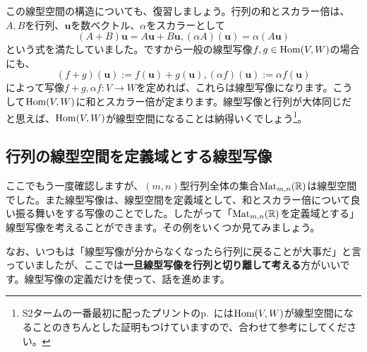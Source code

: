 この線型空間の構造についても、復習しましょう。行列の和とスカラー倍は、$A, B$を行列、$\bm{u}$を数ベクトル、$\alpha$をスカラーとして
\[
(A + B) \bm{u} = A\bm{u} + B\bm{u}, (\alpha A)(\bm{u}) = \alpha (A\bm{u})
\]
という式を満たしていました。ですから一般の線型写像$f, g \in \operatorname{Hom}(V, W)$の場合にも、
\[
(f + g)(\bm{u}) := f(\bm{u}) + g(\bm{u}), (\alpha f)(\bm{u}) := \alpha f(\bm{u})
\]
によって写像$f + g, \alpha f \colon V \rightarrow W$を定めれば、これらは線型写像になります。こうして$\operatorname{Hom}(V, W)$に和とスカラー倍が定まります。線型写像と行列が大体同じだと思えば、$\operatorname{Hom}(V, W)$が線型空間になることは納得いくでしょう\footnote{S2タームの一番最初に配ったプリントのp.~\pageref{subsection:vector_space_of_linear_map}には$\operatorname{Hom}(V, W)$が線型空間になることのきちんとした証明もつけていますので、合わせて参考にしてください。}。

\subsection{行列の線型空間を定義域とする線型写像}

ここでもう一度確認しますが、$(m, n)$型行列全体の集合$\operatorname{Mat}_{m, n}(\mathbb{R})$は線型空間でした。また線型写像は、線型空間を定義域として、和とスカラー倍について良い振る舞いをする写像のことでした。したがって「$\operatorname{Mat}_{m, n}(\mathbb{R})$を定義域とする」線型写像を考えることができます。その例をいくつか見てみましょう。

なお、いつもは「線型写像が分からなくなったら行列に戻ることが大事だ」と言っていましたが、ここでは\textbf{一旦線型写像を行列と切り離して考える}方がいいです。線型写像の定義だけを使って、話を進めます。

